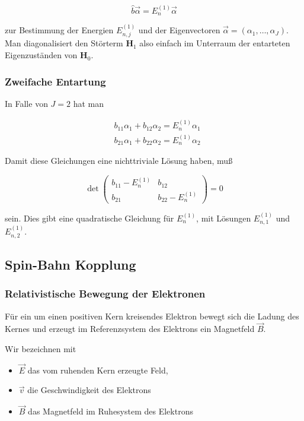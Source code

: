 \documentclass[10pt, letterpaper]{article}
\begin{document}
$$
\hat{b} \vec{\alpha}=E_{n}^{(1)} \vec{\alpha}
$$

zur Bestimmung der Energien $E_{n, j}^{(1)}$ und der Eigenvectoren $\vec{\alpha}=\left(\alpha_{1}, \ldots, \alpha_{J}\right)$. Man diagonalisiert den Störterm $\mathbf{H}_{1}$ also einfach im Unterraum der entarteten Eigenzuständen von $\mathbf{H}_{0}$.

\subsubsection*{Zweifache Entartung}
In Falle von $J=2$ hat man

$$
\begin{aligned}
& b_{11} \alpha_{1}+b_{12} \alpha_{2}=E_{n}^{(1)} \alpha_{1} \\
& b_{21} \alpha_{1}+b_{22} \alpha_{2}=E_{n}^{(1)} \alpha_{2}
\end{aligned}
$$

Damit diese Gleichungen eine nichttriviale Lösung haben, muß

$$
\operatorname{det}\left(\begin{array}{cc}
b_{11}-E_{n}^{(1)} & b_{12} \\
b_{21} & b_{22}-E_{n}^{(1)}
\end{array}\right)=0
$$

sein. Dies gibt eine quadratische Gleichung für $E_{n}^{(1)}$, mit Lösungen $E_{n, 1}^{(1)}$ und $E_{n, 2}^{(1)}$.

\subsection*{Spin-Bahn Kopplung}
\subsubsection*{Relativistische Bewegung der Elektronen}
Für ein um einen positiven Kern kreisendes Elektron bewegt sich die Ladung des Kernes und erzeugt im Referenzsystem des Elektrons ein Magnetfeld $\vec{B}$.

Wir bezeichnen mit

\begin{itemize}
  \item $\vec{E}$ das vom ruhenden Kern erzeugte Feld,
  \item $\vec{v}$ die Geschwindigkeit des Elektrons
  \item $\vec{B}$ das Magnetfeld im Ruhesystem des Elektrons
\end{itemize}
\end{document}
